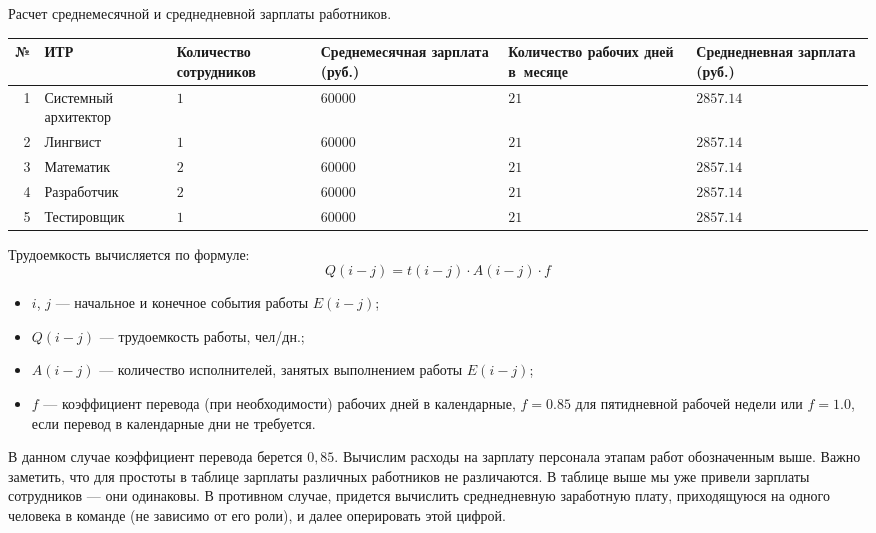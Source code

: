 \pagebreak
\begin{dsmalltable}{ Расчет среднемесячной и среднедневной зарплаты работников.}
	\begin{tabular}{|r|p{3cm}|p{3cm}|p{3cm}|p{2cm}|p{2.5cm}|}
		\hline
			№ & ИТР 
				& Количество сотрудников 
				& Среднемесячная зарплата (руб.) 
				& Количество рабочих дней в~месяце 
				&  Среднедневная зарплата (руб.) \\
		\hline
			1 & Системный архитектор & $1$ & $60000$ & $21$ &  $2857.14$ \\
		\hline
			2 & Лингвист 			 & $1$ & $60000$ & $21$ &  $2857.14$ \\
		\hline
			3 & Математик 			 & $2$ & $60000$ & $21$ &  $2857.14$ \\
		\hline
			4 & Разработчик 		 & $2$ & $60000$ & $21$ &  $2857.14$ \\
		\hline
			5 & Тестировщик 		 & $1$ & $60000$ & $21$ &  $2857.14$ \\
		\hline
	\end{tabular}
\end{dsmalltable}

Трудоемкость вычисляется по формуле:
\[
	Q(i - j) = t(i - j) \cdot A(i - j) \cdot f
\]
\begin{itemize}
	\item  $i$, $j$ --- начальное и конечное события работы $E(i - j)$;
	\item  $Q(i - j)$ --- трудоемкость работы, чел/дн.;
	\item  $A(i - j)$ --- количество исполнителей, занятых выполнением работы $E(i - j)$;
	\item $f$ --- коэффициент перевода (при необходимости) рабочих дней в календарные, 
		$f = 0.85$ для пятидневной рабочей недели или $f = 1.0$, если перевод в календарные дни не требуется. 
\end{itemize}
В данном случае коэффициент перевода берется $0,85$.
Вычислим расходы на зарплату персонала этапам работ обозначенным выше.
Важно заметить, что для простоты в таблице зарплаты различных работников 
не различаются. В таблице выше мы уже привели зарплаты сотрудников --- они одинаковы.
В противном случае, придется вычислить среднедневную заработную плату, приходящуюся на одного
человека в команде (не зависимо от его роли), и далее оперировать этой цифрой.

\pagebreak

